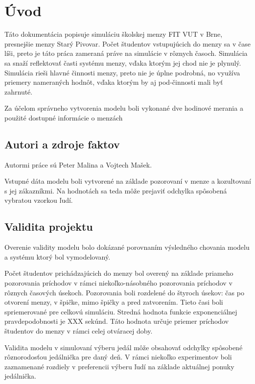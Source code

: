 \documentclass{article}
\begin{document}
\tableofcontents
\newpage
	
\section{Úvod}
Táto dokumentácia popisuje simuláciu \cite[str. 8]{ims} školskej menzy FIT VUT v Brne, presnejšie menzy Starý Pivovar. Počet študentov vstupujúcich do menzy sa v čase líši, preto je táto práca zameraná práve na simulácie v rôznych časoch. Simulácia sa snaží reflektovať časti systému menzy, vďaka ktorým jej chod nie je plynulý. Simulácia rieši hlavné činnosti menzy, preto nie je úplne podrobná, no využíva priemery nameraných hodnôt, vďaka ktorým by aj pod-činnosti mali byť zahrnuté.

Za účelom správneho vytvorenia modelu \cite[str. 7]{ims} boli vykonané dve hodinové merania a použité dostupné informácie o menzách \cite{menzy}

\subsection{Autori a zdroje faktov}
Autormi práce sú Peter Malina a Vojtech Mašek.

Vstupné dáta modelu boli vytvorené na základe pozorovaní v menze a kozultovaní s jej zákazníkmi. Na hodnotách sa teda môže prejaviť odchylka spôsobená vybratou vzorkou ľudí.
\subsection{Validita projektu}
Overenie validity modelu \cite[str. 37]{ims} bolo dokázané porovnaním výsledného chovania modelu \cite[str. 24]{ims} a systému \cite[str. 7]{ims} ktorý bol vymodelovaný.

Počet študentov prichádzajúcich do menzy bol overený na základe priameho pozorovania príchodov v rámci niekoľko-násobného pozorovania príchodov v rôznych časových úsekoch. Pozorovania boli rozdelené do štyroch úsekov: čas po otvorení menzy, v špičke, mimo špičky a pred zatvorením. Tieto časi boli spriemerované pre celkovú simuláciu. Stredná hodnota funkcie exponenciálnej pravdepodobnosti \cite[str. 91]{ims} je XXX sekúnd. Táto hodnota určuje priemer príchodov študentov do menzy v rámci celej otváracej doby.

Validita modelu v simulovaní výberu jedál môže obsahovať odchylky spôsobené rôznorodosťou jedálnička pre daný deň. V rámci niekoľko experimentov boli zaznamenané rozdiely v preferencii výberu ľudí na základe aktuálnej ponuky jedálnička.
\end{document}
